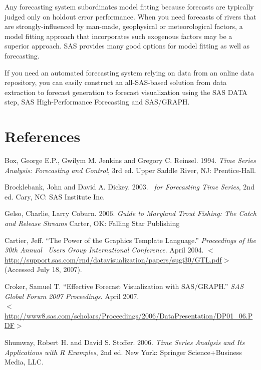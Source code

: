 \documentclass[10pt]{sugconf-ish}
\begin{document}
Any forecasting system subordinates model fitting because forecasts are typically judged only on holdout error performance. When you need forecasts of rivers that are strongly-influenced by man-made, geophysical or meteorological factors, a model fitting approach that incorporates such exogenous factors may be a superior approach. SAS provides many good options for model fitting as well as forecasting.

If you need an automated forecasting system relying on data from an online data repository, you can easily construct an all-SAS-based solution from data extraction to forecast generation to forecast visualization using the SAS DATA step, SAS High-Performance Forecasting and SAS/GRAPH.




\section{References}

\begin{list}{}{\setlength{\leftmargin}{2em}\setlength{\itemindent}{0em}\raggedright}
\item Box, George E.P., Gwilym M. Jenkins and Gregory C. Reinsel. 1994. 
\emph{Time Series Analysis: Forecasting and Control}, 3rd ed. Upper Saddle River, NJ: Prentice-Hall.

\item Brocklebank, John and David A. Dickey. 2003. 
\emph{\SASregistered\ for Forecasting Time Series}, 2nd ed. Cary, NC: SAS Institute Inc.

\item Gelso, Charlie, Larry Coburn. 2006. \emph{Guide to Maryland Trout Fishing:  The Catch and Release Streams} Carter, OK: Falling Star Publishing

\item Cartier, Jeff. ``The Power of the Graphics Template Language.'' \emph{Proceedings of the 30th Annual \SASregistered\ Users Group International Conference}. April 2004. %
$<$\url{http://support.sas.com/rnd/datavisualization/papers/sugi30/GTL.pdf}$>$ (Accessed July 18, 2007).

\item Croker, Samuel T. ``Effective Forecast Visualization with SAS/GRAPH.'' \emph{SAS Global Forum 2007 Proceedings}. April 2007. \\ $<$\url{http://www8.sas.com/scholars/Proceedings/2006/DataPresentation/DP01_06.PDF}$>$

\item Shumway, Robert H. and David S. Stoffer. 2006. 
\emph{Time Series Analysis and Its Applications with R Examples}, 2nd ed. New York: Springer Science+Business Media, LLC.
\end{list}
\end{document}
